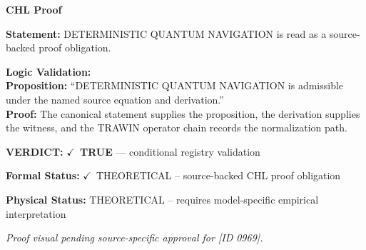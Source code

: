 \vspace{0.45em}
\noindent\textbf{CHL Proof}\par
\textbf{Statement:} DETERMINISTIC QUANTUM NAVIGATION is read as a source-backed proof obligation.

\textbf{Logic Validation:}\\
\textbf{Proposition:} ``DETERMINISTIC QUANTUM NAVIGATION is admissible under the named source equation and derivation.''\\
\textbf{Proof:} The canonical statement supplies the proposition, the derivation supplies the witness, and the TRAWIN operator chain records the normalization path.

\textbf{VERDICT:} \ensuremath{\checkmark}\ \textbf{TRUE} --- conditional registry validation

\textbf{Formal Status:} \ensuremath{\checkmark}\ THEORETICAL -- source-backed CHL proof obligation

\textbf{Physical Status:} THEORETICAL -- requires model-specific empirical interpretation
\par\vspace{0.45em}
\par
\vfill
\begingroup\footnotesize\itshape
Proof visual pending source-specific approval for [ID 0969].
\par\endgroup
\vfill
\endgroup
\endgroup

